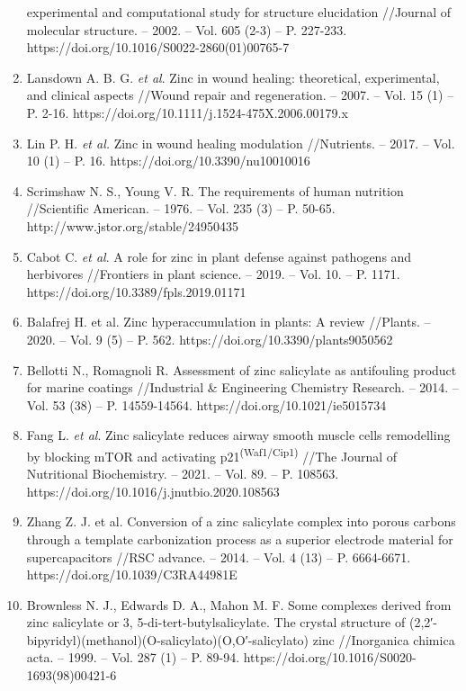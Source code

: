 \begin{enumerate}
  experimental and computational study for structure elucidation
  //Journal of molecular structure. -- 2002. -- Vol. 605 (2-3) -- P.
  227-233. https://doi.org/10.1016/S0022-2860(01)00765-7
\item
  Lansdown A. B. G. \emph{et al}. Zinc in wound healing: theoretical,
  experimental, and clinical aspects //Wound repair and regeneration. --
  2007. -- Vol. 15 (1) -- P. 2-16.
  https://doi.org/10.1111/j.1524-475X.2006.00179.x
\item
  Lin P. H. \emph{et al.} Zinc in wound healing modulation //Nutrients.
  -- 2017. -- Vol. 10 (1) -- P. 16. https://doi.org/10.3390/nu10010016
\item
  Scrimshaw N. S., Young V. R. The requirements of human nutrition
  //Scientific American. -- 1976. -- Vol. 235 (3) -- P. 50-65.
  http://www.jstor.org/stable/24950435
\item
  Cabot C. \emph{et al}. A role for zinc in plant defense against
  pathogens and herbivores //Frontiers in plant science. -- 2019. --
  Vol. 10. -- P. 1171. https://doi.org/10.3389/fpls.2019.01171
\item
  Balafrej H. et al. Zinc hyperaccumulation in plants: A review
  //Plants. -- 2020. -- Vol. 9 (5) -- P. 562.
  https://doi.org/10.3390/plants9050562
\item
  Bellotti N., Romagnoli R. Assessment of zinc salicylate as antifouling
  product for marine coatings //Industrial \& Engineering Chemistry
  Research. -- 2014. -- Vol. 53 (38) -- P. 14559-14564.
  https://doi.org/10.1021/ie5015734
\item
  Fang L. \emph{et al}. Zinc salicylate reduces airway smooth muscle
  cells remodelling by blocking mTOR and activating
  p21\textsuperscript{(Waf1/Cip1)} //The Journal of Nutritional
  Biochemistry. -- 2021. -- Vol. 89. -- P. 108563.
  https://doi.org/10.1016/j.jnutbio.2020.108563
\item
  Zhang Z. J. et al. Conversion of a zinc salicylate complex into porous
  carbons through a template carbonization process as a superior
  electrode material for supercapacitors //RSC advance. -- 2014. -- Vol.
  4 (13) -- P. 6664-6671. https://doi.org/10.1039/C3RA44981E
\item
  Brownless N. J., Edwards D. A., Mahon M. F. Some complexes derived
  from zinc salicylate or 3, 5-di-tert-butylsalicylate. The crystal
  structure of (2,2′-bipyridyl)(methanol)(O-salicylato)(O,O′-salicylato)
  zinc //Inorganica chimica acta. -- 1999. -- Vol. 287 (1) -- P. 89-94.
  https://doi.org/10.1016/S0020-1693(98)00421-6

\end{enumerate}
